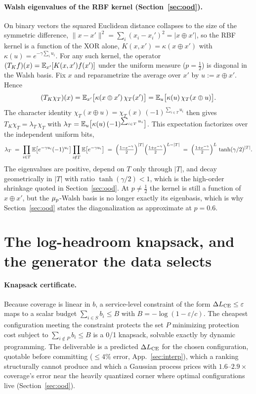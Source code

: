 \paragraph{Walsh eigenvalues of the RBF kernel (Section~\ref{sec:ood}).} On binary vectors the squared
Euclidean distance collapses to the size of the symmetric difference, $\lVert x - x'\rVert^2 =
\sum_i (x_i - x_i')^2 = |x \oplus x'|$, so the RBF kernel is a function of the XOR alone,
$K(x,x') = \kappa(x \oplus x')$ with $\kappa(u) = e^{-\gamma \sum_i u_i}$. For any such kernel, the
operator $(T_K f)(x) = \mathbb{E}_{x'}[K(x,x')f(x')]$ under the uniform measure ($p=\tfrac12$) is diagonal in
the Walsh basis. Fix $x$ and reparametrize the average over $x'$ by $u := x \oplus x'$. Hence
\[
  (T_K\chi_T)(x) = \mathbb{E}_{x'}\bigl[\kappa(x \oplus x')\,\chi_T(x')\bigr]
  = \mathbb{E}_u\bigl[\kappa(u)\,\chi_T(x \oplus u)\bigr].
\]
The character identity
$\chi_T(x \oplus u) = \chi_T(x)\,(-1)^{\sum_{i\in T} u_i}$ then gives
$T_K\chi_T = \lambda_T\,\chi_T$ with $\lambda_T = \mathbb{E}_u\bigl[\kappa(u)\,(-1)^{\sum_{i\in T} u_i}\bigr]$.
This expectation factorizes over the independent uniform bits,
\[
  \lambda_T \;=\; \prod_{i\in T}\mathbb{E}\bigl[e^{-\gamma u_i}(-1)^{u_i}\bigr]
  \prod_{i\notin T}\mathbb{E}\bigl[e^{-\gamma u_i}\bigr]
  \;=\; \Bigl(\tfrac{1-e^{-\gamma}}{2}\Bigr)^{|T|}\Bigl(\tfrac{1+e^{-\gamma}}{2}\Bigr)^{L-|T|}
  \;=\; \Bigl(\tfrac{1+e^{-\gamma}}{2}\Bigr)^{L}\,\tanh(\gamma/2)^{|T|}.
\]
The eigenvalues are positive, depend on $T$ only through $|T|$, and decay geometrically in $|T|$ with
ratio $\tanh(\gamma/2) < 1$, which is the high-order shrinkage quoted in Section~\ref{sec:ood}. At
$p \ne \tfrac12$ the kernel is still a function of $x \oplus x'$, but the $\mu_p$-Walsh basis is no
longer exactly its eigenbasis, which is why Section~\ref{sec:ood} states the diagonalization as
approximate at $p = 0.6$.

\section{The log-headroom knapsack, and the generator the data selects}\label{app:knapsack}

\paragraph{Knapsack certificate.} Because coverage is linear in $b$, a service-level constraint of the
form
$\Delta L_{\mathrm{CE}} \le \varepsilon$ maps to a scalar budget $\sum_{i\in S} b_i \le B$ with
$B = -\log(1 - \varepsilon/c)$. The cheapest configuration meeting the constraint protects the set $P$
minimizing protection
cost subject to $\sum_{i\notin P} b_i \le B$ is a 0/1 knapsack, solvable exactly by
dynamic programming. The deliverable is a predicted $\Delta L_{\mathrm{CE}}$ for the chosen configuration,
quotable before committing ($\le 4\%$ error, App.~\ref{sec:interp}), which a ranking structurally cannot
produce and which a Gaussian process prices with $1.6$--$2.9\times$ coverage's error near the heavily
quantized corner where optimal configurations live (Section~\ref{sec:ood}).

